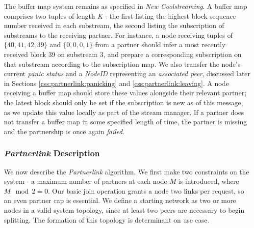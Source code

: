 \documentclass[12pt,a4paper]{article}
\begin{document}
The buffer map system remains as specified in \textit{New Coolstreaming}. A buffer map comprises two tuples of length \textit{K} - the first listing the highest block sequence number received in each substream, the second listing the subscription of substreams to the receiving partner. For instance, a node receiving tuples of \(\{40, 41, 42, 39\}\) and \(\{0, 0, 0, 1\}\) from a partner should infer a most recently received block 39 on substream 3, and prepare a corresponding subscription on that substream according to the subscription map. We also transfer the node's current \textit{panic status} and a \textit{NodeID} representing an \textit{associated peer}, discussed later in Sections \ref{css:partnerlink:panicking} and \ref{css:partnerlink:leaving}. A node receiving a buffer map should store these values alongside their relevant partner; the latest block should only be set if the subscription is new as of this message, as we update this value locally as part of the stream manager. If a partner does not transfer a buffer map in some specified length of time, the partner is missing and the partnership is once again \textit{failed}.

\subsubsection{\textit{Partnerlink} Description} \label{css:partnerlink:description}
We now describe the \textit{Partnerlink} algorithm. We first make two constraints on the system - a maximum number of partners at each node \(M\) is introduced, where \(M\mod{2} = 0\). Our basic join operation grants a node two links per request, so an even partner cap is essential. We define a starting network as two or more nodes in a valid system topology, since at least two peers are necessary to begin splitting. The formation of this topology is determinant on use case.

\end{document}
